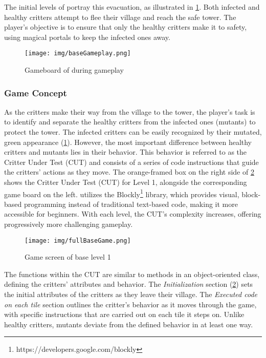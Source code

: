 The initial levels of \toolname portray this evacuation, as illustrated in \cref{fig:baseGameplay}. Both infected and healthy critters attempt to flee their village and reach the safe tower. The player's objective is to ensure that only the healthy critters make it to safety, using magical portals to keep the infected ones away.

\begin{figure}
	\centering
	\texttt{[image: img/baseGameplay.png]}
	\caption{Gameboard of \toolname during gameplay}
	\label{fig:baseGameplay}
\end{figure}

\subsubsection{Game Concept}

As the critters make their way from the village to the tower, the
player's task is to identify and separate the healthy critters from
the infected ones (mutants) to protect the tower. The infected
critters can be easily recognized by their mutated, green appearance
(\cref{fig:baseGameplay}). However, the most important difference
between healthy critters and mutants lies in their behavior. This
behavior is referred to as the Critter Under Test (CUT) and consists
of a series of code instructions that guide the critters' actions as
they move.
%
The orange-framed box on the right side of \cref{fig:gameScreen} shows
the Critter Under Test (CUT) for Level 1, alongside the corresponding
game board on the left. 
%
\toolname utilizes the
Blockly\footnote{https://developers.google.com/blockly} library, which
provides visual, block-based programming instead of traditional
text-based code, making it more accessible for beginners. With each
level, the CUT's complexity increases, offering progressively more
challenging gameplay.

\begin{figure}
	\centering
	\texttt{[image: img/fullBaseGame.png]}
	\caption{Game screen of base level 1}
	\label{fig:gameScreen}
\end{figure}


%
The functions within the CUT are similar to
methods in an object-oriented class, defining the critters' attributes
and behavior.
%
The \textit{Initialization} section (\cref{fig:gameScreen}) sets the initial attributes of the critters as they leave their village. The \textit{Executed code on each tile} section outlines the critter's behavior as it moves through the game, with specific instructions that are carried out on each tile it steps on. Unlike healthy critters, mutants deviate from the defined behavior in at least one way.



